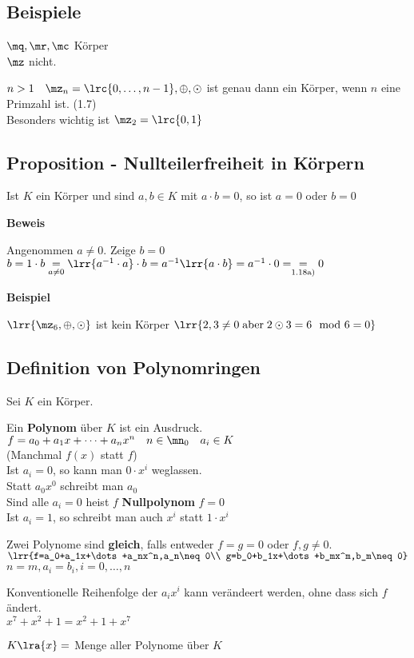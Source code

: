 \subsection{Beispiele}
		\item $\mq,\mr,\mc$ Körper\\
			$\mz$ nicht.
		\item $n>1\quad\mz_n=\lrc{0,\dots,n-1},\oplus,\odot$ ist genau dann ein Körper, wenn $n$ eine Primzahl ist. (1.7)\\
			Besonders wichtig ist $\mz_2=\lrc{0,1}$
	\subExEnd
\subsection{Proposition - Nullteilerfreiheit in Körpern}
	Ist $K$ ein Körper und sind $a,b\in K$ mit $a\cdot b=0$, so ist $a=0$ oder $b=0$
	
	\textbf{Beweis}
	
	Angenommen $a\neq 0$. Zeige $b=0$\\
	$b=1\cdot b \underset{a\neq 0}{=} \lrr{a^{-1}\cdot a}\cdot b=a^{-1}\lrr{a\cdot b}=a^{-1}\cdot 0=\underset{\mbox{\scriptsize 1.18a)}}{=}0$
	
	\textbf{Beispiel}
	
	$\lrr{\mz_6,\oplus,\odot}$ ist kein Körper $\lrr{2,3\neq 0 \;\mbox{aber}\; 2\odot 3=6\mod 6 =0}$
\subsection{Definition von Polynomringen}
	Sei $K$ ein Körper.
		\item Ein \textbf{Polynom} über $K$ ist ein Ausdruck.\\
			$f=a_0+a_1x+\dots+a_nx^n\quad n\in\mn_0\quad a_i\in K$\\
			(Manchmal $f(x)$ statt $f$)\\
			Ist $a_i=0$, so kann man $0\cdot x^i$ weglassen.\\
			Statt $a_0x^0$ schreibt man $a_0$\\
			Sind alle $a_i=0$ heist $f$ \textbf{Nullpolynom} $f=0$\\
			Ist $a_i = 1$, so schreibt man auch $x^i$ statt $1\cdot x^i$
		\item Zwei Polynome sind \textbf{gleich}, falls entweder $f=g=0$ oder $f,g\neq 0$.\\
			$\lrr{f=a_0+a_1x+\dots+a_nx^n,a_n\neq 0\\
			g=b_0+b_1x+\dots+b_mx^m,b_m\neq 0}$\\
			$n=m, a_i=b_i, i=0,\dots,n$
		\item Konventionelle Reihenfolge der $a_ix^i$ kann verändeert werden, ohne dass sich $f$ ändert.\\
			$x^7+x^2+1=x^2+1+x^7$
		\item $K\lra{x}=$ Menge aller Polynome über $K$
	\subExEnd